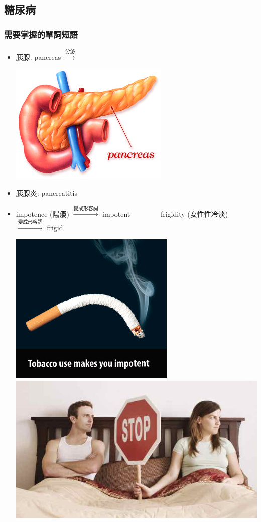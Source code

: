 \subsection{糖尿病}
\subsubsection*{需要掌握的單詞短語}
\begin{itemize}
  \itemsep0em
  \item 胰腺: pancreas $\xrightarrow{\text{分泌}}$ 
  \begin{center}
    \includegraphics[scale=.5]{pics/pancreas}
  \end{center}
  \item 胰腺炎: pancreatitis
  \item impotence (陽痿) $\xrightarrow{\text{變成形容詞}}$ impotent \ \ \ \ \ \ \ \ frigidity (女性性冷淡) $\xrightarrow{\text{變成形容詞}}$ frigid
  \begin{center}
    \includegraphics[scale=.6]{pics/impotence}
    \includegraphics[scale=.45]{pics/frigidity}

\end{center}
\end{itemize}
